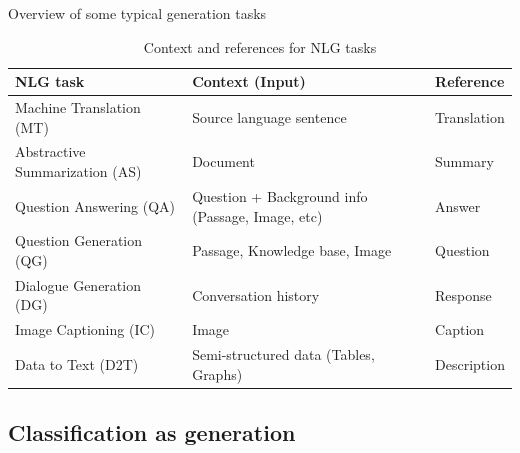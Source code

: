 \documentclass[12pt,aspectratio=169,handout]{beamer}
\begin{document}
\begin{frame}{Overview of some typical generation tasks}

\begin{table}
\begin{footnotesize}
\begin{tabular}{p{5cm}p{6cm}l}
\toprule
NLG task & Context (Input) & Reference \\
\midrule
Machine Translation (MT) & Source language sentence & Translation \\ 
Abstractive Summarization (AS) & Document & Summary \\
Question Answering (QA) & Question + Background info (Passage, Image, etc) & Answer \\
Question Generation (QG) & Passage, Knowledge base, Image & Question \\
Dialogue Generation (DG) & Conversation history & Response \\
Image Captioning (IC) & Image & Caption \\
Data to Text (D2T) & Semi-structured data (Tables, Graphs) & Description \\
\bottomrule
\end{tabular}
\end{footnotesize}
\caption{Context and references for NLG tasks}
\end{table}




\end{frame}


\subsection{Classification as generation}
\end{document}
